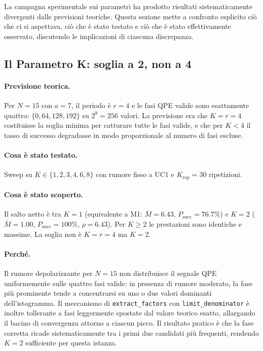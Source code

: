 \begin{onehalfspace}
La campagna sperimentale sui parametri ha prodotto risultati sistematicamente divergenti dalle previsioni teoriche. Questa sezione mette a confronto esplicito ciò che ci si aspettava, ciò che è stato testato e ciò che è stato effettivamente osservato, discutendo le implicazioni di ciascuna discrepanza.

\subsection{Il Parametro K: soglia a 2, non a 4}

\paragraph{Previsione teorica.}
Per $N=15$ con $a=7$, il periodo è $r=4$ e le fasi QPE valide sono esattamente quattro: $\{0, 64, 128, 192\}$ su $2^8 = 256$ valori. La previsione era che $K = r = 4$ costituisse la soglia minima per catturare tutte le fasi valide, e che per $K < 4$ il tasso di successo degradasse in modo proporzionale al numero di fasi escluse.

\paragraph{Cosa è stato testato.}
Sweep su $K \in \{1, 2, 3, 4, 6, 8\}$ con rumore fisso a UC1 e $K_{\text{rep}} = 30$ ripetizioni.

\paragraph{Cosa è stato scoperto.}
Il salto netto è tra $K=1$ (equivalente a M1: $\bar{M}=6.43$, $P_{\text{succ}}=76.7\%$) e $K=2$ ($\bar{M}=1.00$, $P_{\text{succ}}=100\%$, $\rho=6.43$). Per $K \geq 2$ le prestazioni sono identiche e massime. La soglia non è $K=r=4$ ma $K=2$.

\paragraph{Perché.}
Il rumore depolarizzante per $N=15$ non distribuisce il segnale QPE uniformemente sulle quattro fasi valide: in presenza di rumore moderato, la fase più prominente tende a concentrarsi su uno o due valori dominanti dell'istogramma. Il meccanismo di \texttt{extract\_factors} con \texttt{limit\_denominator} è inoltre tollerante a fasi leggermente spostate dal valore teorico esatto, allargando il bacino di convergenza attorno a ciascun picco. Il risultato pratico è che la fase corretta ricade sistematicamente tra i primi due candidati più frequenti, rendendo $K=2$ sufficiente per questa istanza.


\end{onehalfspace}
